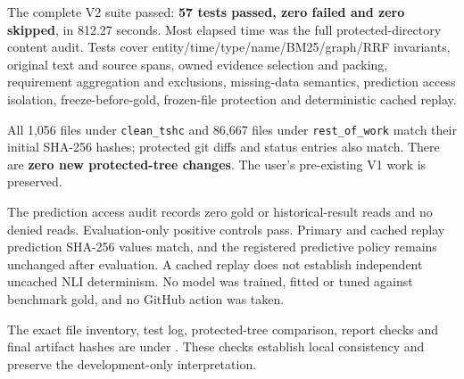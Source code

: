 The complete V2 suite passed: \textbf{57 tests passed, zero failed and zero skipped}, in 812.27 seconds. Most elapsed time was the full protected-directory content audit. Tests cover entity/time/type/name/BM25/graph/RRF invariants, original text and source spans, owned evidence selection and packing, requirement aggregation and exclusions, missing-data semantics, prediction access isolation, freeze-before-gold, frozen-file protection and deterministic cached replay.

All 1,056 files under \texttt{clean\_tshc} and 86,667 files under \texttt{rest\_of\_work} match their initial SHA-256 hashes; protected git diffs and status entries also match. There are \textbf{zero new protected-tree changes}. The user's pre-existing V1 work is preserved.

The prediction access audit records zero gold or historical-result reads and no denied reads. Evaluation-only positive controls pass. Primary and cached replay prediction SHA-256 values match, and the registered predictive policy remains unchanged after evaluation. A cached replay does not establish independent uncached NLI determinism. No model was trained, fitted or tuned against benchmark gold, and no GitHub action was taken.

The exact file inventory, test log, protected-tree comparison, report checks and final artifact hashes are under . These checks establish local consistency and preserve the development-only interpretation.
